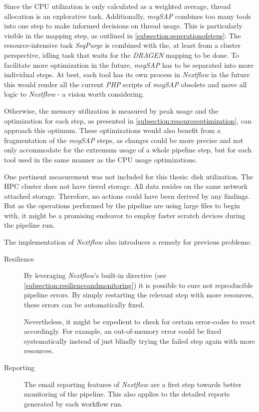 Since the CPU utilization is only calculated as a weighted average, thread allocation is an explorative task. Additionally, \textit{\ac{megSAP}} combines too many tools into one step to make informed decisions on thread usage. This is particularly visible in the mapping step, as outlined in \cref{subsection:seperationofsteps}: The resource-intensive task \textit{SeqPurge} is combined with the, at least from a cluster perspective, idling task that waits for the \textit{DRAGEN} mapping to be done. To facilitate more optimization in the future, \textit{\ac{megSAP}} has to be separated into more individual steps. At best, each tool has its own process in \textit{Nextflow} in the future \textemdash this would render all the current \textit{PHP} scripts of \textit{\ac{megSAP}} obsolete and move all logic to \textit{Nextflow} - a vision worth considering.

Otherwise, the memory utilization is measured by peak usage and the optimization for each step, as presented in \cref{subsection:resourceoptimization}, can approach this optimum. These optimizations would also benefit from a fragmentation of the \textit{\ac{megSAP}} steps, as changes could be more precise and not only accommodate for the extremum usage of a whole pipeline step, but for each tool used \textemdash in the same manner as the CPU usage optimizations.

One pertinent measurement was not included for this thesis: disk utilization. The \ac{HPC} cluster does not have tiered storage. All data resides on the same network attached storage. Therefore, no actions could have been derived by any findings. But as the operations performed by the pipeline are using large files to begin with, it might be a promising endeavor to employ faster scratch devices during the pipeline run.

The implementation of \textit{Nextflow} also introduces a remedy for previous problems:
\begin{description}
    \item[Resilience] By leveraging \textit{Nextflow}'s built-in  directive (see \cref{subsection:resilienceandmonitoring}) it is possible to cure not reproducible pipeline errors. By simply restarting the relevant step with more resources, these errors can be automatically fixed.
    
    Nevertheless, it might be expedient to check for certain error-codes to react accordingly. For example, an out-of-memory error could be fixed systematically instead of just blindly trying the failed step again with more resources.
    
    \item[Reporting] The email reporting features of \textit{Nextflow} are a first step towards better monitoring of the pipeline. This also applies to the detailed reports generated by each workflow run.
\end{description}

